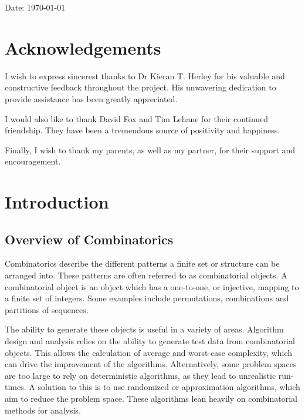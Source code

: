 \documentclass[12pt]{article}
\begin{document}
Date: \today
\vspace*{\fill}
\pagebreak

\section*{Acknowledgements}
\vspace*{7em}
I wish to express sincerest thanks to Dr Kieran T. Herley for his valuable and constructive feedback throughout the project. His unwavering dedication to provide assistance has been greatly appreciated. 

I would also like to thank David Fox and Tim Lehane for their continued friendship. They have been a tremendous source of positivity and happiness.

Finally, I wish to thank my parents, as well as my partner, for their support and encouragement.
\vspace*{\fill}
\pagebreak

\tableofcontents

\cleardoublepage
{}


\section{Introduction}

\subsection{Overview of Combinatorics}
Combinatorics describe the different patterns a finite set or structure can be arranged into. These patterns are often referred to as combinatorial objects. A combinatorial object is an object which has a one-to-one, or injective, mapping to a finite set of integers. Some examples include permutations, combinations and partitions of sequences. 

The ability to generate these objects is useful in a variety of areas. Algorithm design and analysis relies on the ability to generate test data from combinatorial objects. This allows the calculation of average and worst-case complexity, which can drive the improvement of the algorithms. Alternatively, some problem spaces are too large to rely on deterministic algorithms, as they lead to unrealistic run-times. A solution to this is to use randomized or approximation algorithms, which aim to reduce the problem space. These algorithms lean heavily on combinatorial methods for analysis.
\end{document}
